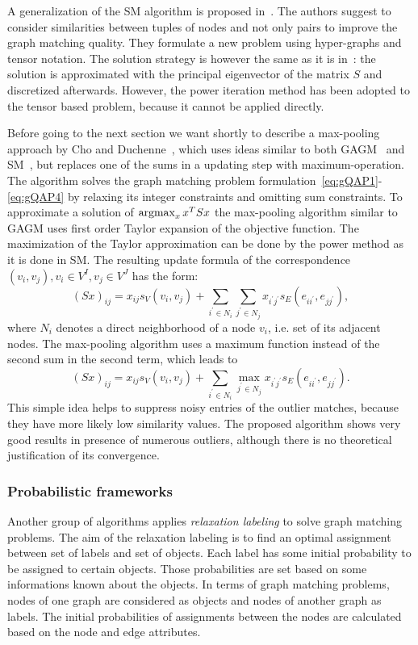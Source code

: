 A generalization of the SM algorithm is proposed in~\cite{Duchenne2011}. The authors suggest to consider similarities between tuples of nodes and not only pairs to improve the graph matching quality. They formulate a new problem using hyper-graphs and tensor notation. The solution strategy is however the same as it is in~\cite{Leordeanu2005_SM}: the solution is approximated with the principal eigenvector of the matrix $S$ and discretized afterwards. However, the power iteration method has been adopted to the tensor based problem, because it cannot be applied directly.

Before going to the next section we want shortly to describe a max-pooling approach by Cho and Duchenne~\cite{Cho2014_Haystack}, which uses ideas similar to both GAGM~\cite{Rangarajan1996_GAGM} and SM~\cite{Leordeanu2005_SM}, but replaces one of the sums in a updating step with maximum-operation. The algorithm solves the graph matching problem formulation~\eqref{eq:gQAP1}-\eqref{eq:gQAP4} by relaxing its integer constraints and omitting sum constraints. To approximate a solution of $\mathop{\rm argmax}_{x}x^TSx$ the max-pooling algorithm similar to GAGM uses first order Taylor expansion of the objective function. The maximization of the Taylor approximation can be done by the power method as it is done in SM.
The resulting update formula of the correspondence $(v_i,v_j),v_i\in V^I,v_j\in V^J$ has the form:
\begin{equation}
(Sx)_{ij}=x_{ij}s_V(v_i,v_{j})+\sum_{i^\prime\in N_i}\sum_{j^\prime\in N_j}x_{i^\prime j^\prime}s_E(e_{ii^\prime},e_{jj^\prime}),
\end{equation}
where $N_i$ denotes a direct neighborhood of a node $v_i$, i.e. set of its adjacent nodes.
The max-pooling algorithm uses a maximum function instead of the second sum in the second term, which leads to
\begin{equation}
(Sx)_{ij}=x_{ij}s_V(v_i,v_{j})+\sum_{i^\prime\in N_i}\max_{j^\prime\in N_j}x_{i^\prime j^\prime}s_E(e_{ii^\prime},e_{jj^\prime}).
\end{equation}
This simple idea helps to suppress noisy entries of the outlier matches, because they have more likely low similarity values. The proposed algorithm shows very good results in presence of numerous outliers, although there is no theoretical justification of its convergence.
\subsubsection{Probabilistic frameworks}
Another group of algorithms applies \emph{relaxation labeling} to solve graph matching problems. The aim of the relaxation labeling is to find an optimal assignment between set of labels and set of objects. Each label has some initial probability to be assigned to certain objects. Those probabilities are set based on some informations known about the objects. In terms of graph matching problems, nodes of one graph are considered as objects and nodes of another graph as labels. The initial probabilities of assignments between the nodes are calculated  based on the node and edge attributes. 

